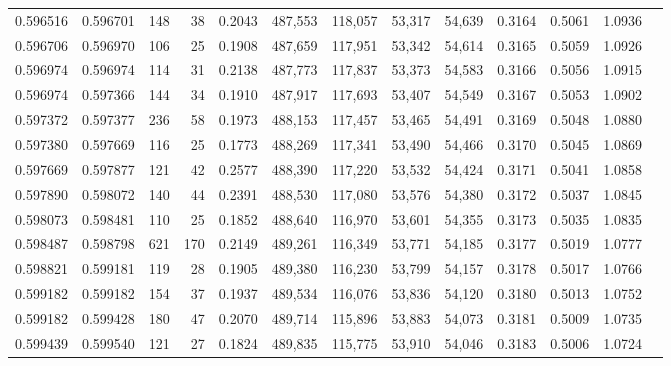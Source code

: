 \begin{tabular}{rrrrrrrrrrrrr}
0.596516 & 0.596701 &   148 &  38 &                                     0.2043 & 487,553 & 118,057 &  53,317 &  54,639 & 0.3164 & 0.5061 & 1.0936 \\
0.596706 & 0.596970 &   106 &  25 &                                     0.1908 & 487,659 & 117,951 &  53,342 &  54,614 & 0.3165 & 0.5059 & 1.0926 \\
0.596974 & 0.596974 &   114 &  31 &                                     0.2138 & 487,773 & 117,837 &  53,373 &  54,583 & 0.3166 & 0.5056 & 1.0915 \\
0.596974 & 0.597366 &   144 &  34 &                                     0.1910 & 487,917 & 117,693 &  53,407 &  54,549 & 0.3167 & 0.5053 & 1.0902 \\
0.597372 & 0.597377 &   236 &  58 &                                     0.1973 & 488,153 & 117,457 &  53,465 &  54,491 & 0.3169 & 0.5048 & 1.0880 \\
0.597380 & 0.597669 &   116 &  25 &                                     0.1773 & 488,269 & 117,341 &  53,490 &  54,466 & 0.3170 & 0.5045 & 1.0869 \\
0.597669 & 0.597877 &   121 &  42 &                                     0.2577 & 488,390 & 117,220 &  53,532 &  54,424 & 0.3171 & 0.5041 & 1.0858 \\
0.597890 & 0.598072 &   140 &  44 &                                     0.2391 & 488,530 & 117,080 &  53,576 &  54,380 & 0.3172 & 0.5037 & 1.0845 \\
0.598073 & 0.598481 &   110 &  25 &                                     0.1852 & 488,640 & 116,970 &  53,601 &  54,355 & 0.3173 & 0.5035 & 1.0835 \\
0.598487 & 0.598798 &   621 & 170 &                                     0.2149 & 489,261 & 116,349 &  53,771 &  54,185 & 0.3177 & 0.5019 & 1.0777 \\
0.598821 & 0.599181 &   119 &  28 &                                     0.1905 & 489,380 & 116,230 &  53,799 &  54,157 & 0.3178 & 0.5017 & 1.0766 \\
0.599182 & 0.599182 &   154 &  37 &                                     0.1937 & 489,534 & 116,076 &  53,836 &  54,120 & 0.3180 & 0.5013 & 1.0752 \\
0.599182 & 0.599428 &   180 &  47 &                                     0.2070 & 489,714 & 115,896 &  53,883 &  54,073 & 0.3181 & 0.5009 & 1.0735 \\
0.599439 & 0.599540 &   121 &  27 &                                     0.1824 & 489,835 & 115,775 &  53,910 &  54,046 & 0.3183 & 0.5006 & 1.0724 \\

\end{tabular}
